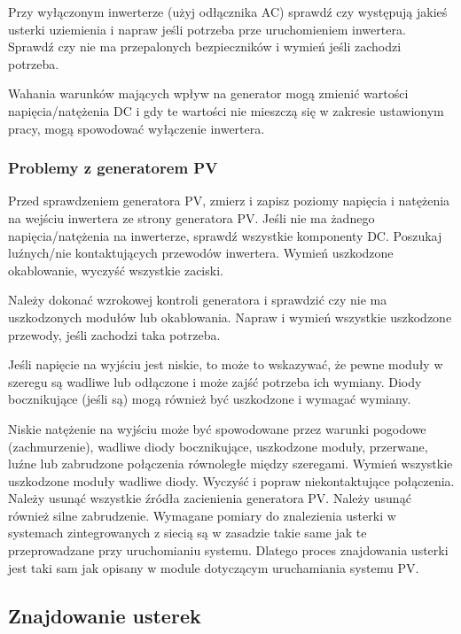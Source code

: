 \documentclass[12pt,a4paper]{article}
\begin{document}
Przy wyłączonym inwerterze (użyj odłącznika AC) sprawdź czy występują 
jakieś usterki uziemienia i napraw jeśli potrzeba prze uruchomieniem 
inwertera. Sprawdź czy nie ma przepalonych bezpieczników i wymień jeśli 
zachodzi potrzeba. 

Wahania warunków mających wpływ na generator mogą zmienić wartości 
napięcia/natężenia DC i gdy te wartości nie mieszczą się w zakresie 
ustawionym pracy, mogą spowodować wyłączenie inwertera. 

 

\subsubsection{Problemy z generatorem PV}


Przed sprawdzeniem generatora PV, zmierz i zapisz poziomy napięcia i 
natężenia na wejściu inwertera ze strony generatora PV. Jeśli nie ma 
żadnego napięcia/natężenia na inwerterze, sprawdź wszystkie komponenty 
DC. Poszukaj luźnych/nie kontaktujących przewodów inwertera. Wymień 
uszkodzone okablowanie, wyczyść wszystkie zaciski. 

Należy dokonać wzrokowej kontroli generatora i sprawdzić czy nie ma 
uszkodzonych modułów lub okablowania. Napraw i wymień wszystkie 
uszkodzone przewody, jeśli zachodzi taka potrzeba. 

Jeśli napięcie na wyjściu jest niskie, to może to wskazywać, że pewne 
moduły w szeregu są wadliwe lub odłączone i może zajść potrzeba ich 
wymiany. Diody bocznikujące (jeśli są) mogą również być uszkodzone i 
wymagać wymiany. 

Niskie natężenie na wyjściu może być spowodowane przez warunki pogodowe 
(zachmurzenie), wadliwe diody bocznikujące, uszkodzone moduły, 
przerwane, luźne lub zabrudzone połączenia równoległe między szeregami. 
Wymień wszystkie uszkodzone moduły wadliwe diody. Wyczyść i popraw 
niekontaktujące połączenia. Należy usunąć wszystkie źródła zacienienia 
generatora PV. Należy usunąć również silne zabrudzenie. Wymagane pomiary 
do znalezienia usterki w systemach zintegrowanych z siecią są w zasadzie 
takie same jak te przeprowadzane przy uruchomianiu systemu. Dlatego 
proces znajdowania usterki jest taki sam jak opisany w module dotyczącym 
uruchamiania systemu PV. 


\subsection{Znajdowanie usterek}
\end{document}
